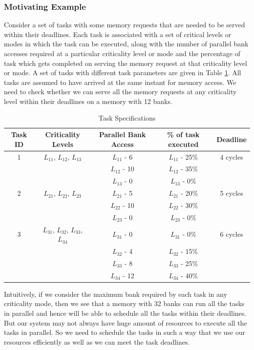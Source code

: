 \subsubsection{Motivating Example}\label{me}
Consider a set of tasks with some memory requests that are needed to be served within their deadlines. Each task is 
associated with a set of critical levels or modes in which the task can be executed, along with the number of parallel bank 
accesses required at a particular criticality level or mode and the percentage of task which gets completed on serving the 
memory request at that criticality level or mode. A set of tasks with different task parameters are given in Table \ref{tab1}. 
All tasks are assumed to have arrived at the same instant for memory access. We need to check whether we can serve all the 
memory requests at any criticality level within their deadlines on a memory with 12 banks.

\begin{table}[t]
 \begin{tabular}{|c|c|c|c|c|}\hline
 Task ID & Criticality Levels & Parallel Bank Access  & \% of task executed & Deadline \\ \hline
 1 & {$L_{11}$, $L_{12}$, $L_{13}$} & $L_{11}$ - 6 & $L_{11}$ - 25\% & 4 cycles \\
   &  & $L_{12}$ - 10 & $L_{12}$ - 35\% &  \\
   &  & $L_{13}$ - 0 & $L_{13}$ - 0\% & \\ \hline
 2 & {$L_{21}$, $L_{22}$, $L_{23}$} & $L_{21}$ - 5 & $L_{21}$ - 20\% & 5 cycles \\
   &  & $L_{22}$ - 10 & $L_{22}$ - 30\% & \\
   &  & $L_{23}$ - 0 & $L_{23}$ - 0\% & \\ \hline
 3 & {$L_{31}$, $L_{32}$, $L_{33}$, $L_{34}$} & $L_{31}$ - 0 & $L_{31}$ - 0\% & 6 cycles \\
   &  & $L_{32}$ - 4 & $L_{32}$ - 15\% & \\
   &  & $L_{33}$ - 8 & $L_{33}$ - 25\% & \\
   &  & $L_{34}$ - 12 & $L_{34}$ - 40\% & \\ \hline 
 \end{tabular}
\caption{Task Specifications}
\label{tab1}
\end{table}

\noindent
Intuitively, if we consider the maximum bank required by each task in any criticality mode, then we see that a memory 
with 32 banks can run all the tasks in parallel and hence will be able to schedule all the tasks within their deadlines.
But our system may not always have huge amount of resources to execute all the tasks in parallel. So we need to schedule the 
tasks in such a way that we use our resources efficiently as well as we can meet the task deadlines. 

